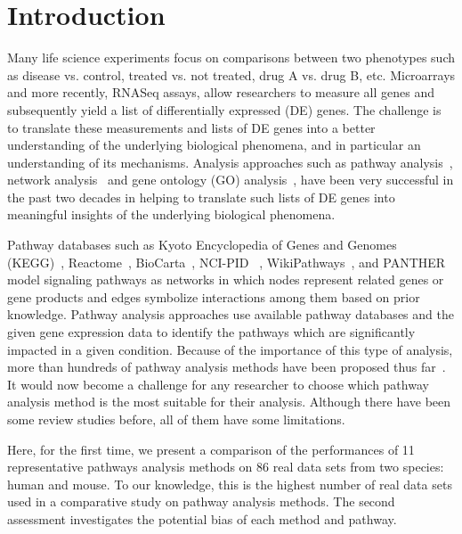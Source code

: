 \section{Introduction}
\label{chap:Introduction}


Many life science experiments focus on comparisons between two phenotypes such as disease vs. control, treated vs. not treated, drug A vs. drug B, etc. Microarrays and more recently, RNASeq assays, allow researchers to measure all genes and subsequently  yield a list of differentially expressed (DE) genes. The challenge is to translate these measurements and lists of DE genes into a better understanding of the underlying biological phenomena, and in particular an understanding of its mechanisms. Analysis approaches such as pathway analysis~\cite{DraghiciOntologicalToolsReview:2005,Khatri:2012, mitrea2013methods, tarca2013comparison, nguyen2018network, ihnatova2018critical, nguyen2019identifying}, network analysis~\cite{mitra2013integrative} and gene ontology (GO) analysis~\cite{DraghiciOntologicalToolsReview:2005,Rhee:2008}, have been very successful in the past two decades in helping to translate such lists of DE genes into meaningful insights of the underlying biological phenomena. 

Pathway databases such as Kyoto Encyclopedia of Genes and Genomes (KEGG)~\cite{Kanehisa:2000}, Reactome~\cite{croft2014reactome}, BioCarta~\cite{BioCartaWWW}, NCI-PID ~\cite{Schaefer:2009}, WikiPathways~\cite{pico2008wikipathways}, and PANTHER~\cite{thomas2003panther} model signaling pathways as networks in which nodes represent related genes or gene products and edges symbolize interactions among them based on prior knowledge. 
Pathway analysis approaches use available pathway databases and the given gene expression data to identify the pathways which are significantly impacted in a given condition. 
Because of the importance of this type of analysis, more than hundreds of pathway analysis methods have been proposed thus far~\cite{DraghiciOntologicalToolsReview:2005,Khatri:2002,mitrea2013methods}.
It would now become a challenge for any researcher to choose which pathway analysis method is the most suitable for their analysis. 
Although there have been some review studies before, all of them have some limitations.

Here, for the first time, we present a comparison of the performances of 11 representative pathways analysis methods on 86 real data sets from two species: human and mouse. 
To our knowledge, this is the highest number of real data sets used in a comparative study on pathway analysis methods.
The second assessment investigates the potential bias of each method and pathway.

